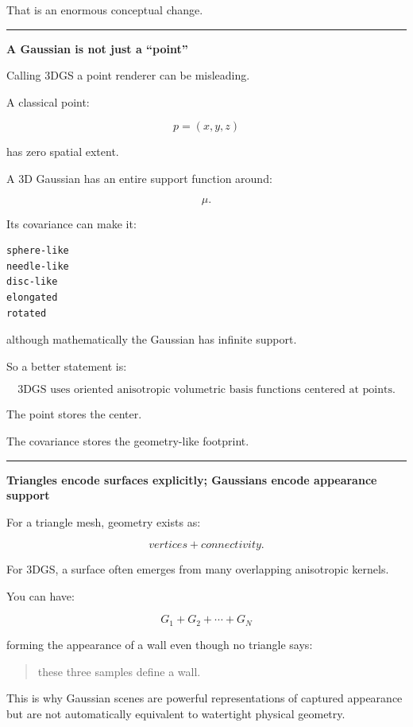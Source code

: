 That is an enormous conceptual change.

\begin{center}\rule{0.5\linewidth}{0.5pt}\end{center}

\textbf{A Gaussian is not just a ``point''}

Calling 3DGS a point renderer can be misleading.

A classical point:

\[
p=(x,y,z)
\]

has zero spatial extent.

A 3D Gaussian has an entire support function around:

\[
\mu.
\]

Its covariance can make it:

\begin{verbatim}
sphere-like
needle-like
disc-like
elongated
rotated
\end{verbatim}

although mathematically the Gaussian has infinite support.

So a better statement is:

\[
\boxed{
\text{3DGS uses oriented anisotropic volumetric basis functions centered at points.}
}
\]

The point stores the center.

The covariance stores the geometry-like footprint.

\begin{center}\rule{0.5\linewidth}{0.5pt}\end{center}

\textbf{Triangles encode surfaces explicitly; Gaussians encode appearance support}

For a triangle mesh, geometry exists as:

\[
vertices + connectivity.
\]

For 3DGS, a surface often emerges from many overlapping anisotropic kernels.

You can have:

\[
G_1+G_2+\cdots+G_N
\]

forming the appearance of a wall even though no triangle says:

\begin{quote}
these three samples define a wall.
\end{quote}

This is why Gaussian scenes are powerful representations of captured appearance but are not automatically equivalent to watertight physical geometry.

